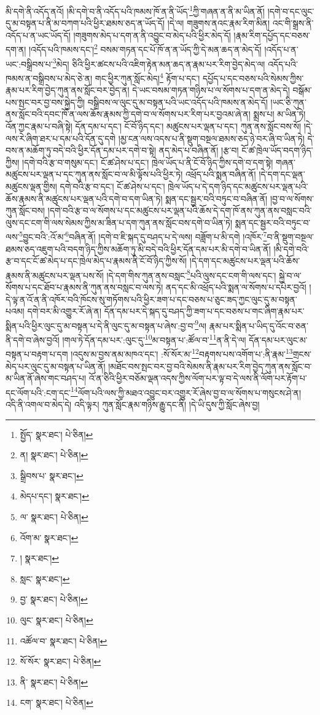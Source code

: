 མི་དགེ་ནི་འདོད་ནའོ། །མི་དགེ་བ་ནི་འདོད་པའི་ཁམས་ཁོ་ན་ནི་ཡོད་\footnote{སྤྱོད་  སྣར་ཐང་།  པེ་ཅིན། }ཀྱི་གཞན་ན་ནི་མ་ཡིན་ནོ། །དགེ་བ་དང་ལུང་དུ་མ་བསྟན་པ་ནི་མ་བཀག་པའི་ཕྱིར་ཐམས་ཅད་ན་ཡོད་དོ། །དེ་ལ། གཟུགས་ནའང་རྣམ་རིག་མིན། འང་གི་སྒྲས་ནི་འདོད་པ་ན་ཡང་ཡོད་དོ། །གཟུགས་མེད་པ་དག་ན་ནི་འབྱུང་བ་མེད་པའི་ཕྱིར་མེད་དོ། །རྣམ་རིག་དཔྱོད་དང་བཅས་དག་ན། །འདོད་པའི་ཁམས་དང་།\footnote{ན།  སྣར་ཐང་།  པེ་ཅིན། } བསམ་གཏན་དང་པོ་ཁོ་ན་ན་ཡོད་ཀྱི་དེ་མན་ཆད་ན་མེད་དོ། །འདོད་པ་ན་ཡང་:བསྒྲིབས་པ་\footnote{སྒྲིབས་པ་  སྣར་ཐང་། }མེད། ཅིའི་ཕྱིར་ཚངས་པའི་འཇིག་རྟེན་མན་ཆད་ན་རྣམ་པར་རིག་བྱེད་མེད་ལ། འདོད་པའི་ཁམས་ན་བསྒྲིབས་པ་མེད་ཅེ་ན། གང་ཕྱིར་ཀུན་སློང་མེད།\footnote{མེདཔ་དང་།  སྣར་ཐང་། } རྟོག་པ་དང་། དཔྱོད་པ་དང་བཅས་པའི་སེམས་ཀྱིས་རྣམ་པར་རིག་བྱེད་ཀུན་ནས་སློང་བར་བྱེད་ན། དེ་ཡང་བསམ་གཏན་གཉིས་པ་ལ་སོགས་པ་དག་ན་མེད་དེ། བསྒོམ་པས་སྤང་བར་བྱ་བས་སྐྱེད་ཀྱི། བསྒྲིབས་ལ་ལུང་དུ་མ་བསྟན་པའི་ཡང་འདོད་པའི་ཁམས་ན་མེད་དོ། །ཡང་ཅི་ཀུན་ནས་སློང་བའི་དབང་ཁོ་ན་ལས་ཆོས་རྣམས་ཀྱི་དགེ་བ་ལ་སོགས་པར་རིག་པར་བྱའམ་ཞེ་ན། སྨྲས་པ། མ་ཡིན་ཏེ། འོན་ཀྱང་རྣམ་པ་བཞི་སྟེ། དོན་དམ་པ་དང་། ངོ་བོ་ཉིད་དང་། མཚུངས་པར་ལྡན་པ་དང་། ཀུན་ནས་སློང་བས་སོ། །དེ་ལས་རེ་ཞིག་ཐར་པ་དམ་པའི་དོན་དུ་དགེ །མྱ་ངན་ལས་འདས་པ་ནི་སྡུག་བསྔལ་ཐམས་ཅད་ཉེ་བར་ཞི་བ་ཡིན་ཏེ། དེ་བས་ན་མཆོག་ཏུ་བདེ་བའི་ཕྱིར་དོན་དམ་པར་དགེ་བ་སྟེ། ནད་མེད་པ་བཞིན་ནོ། །རྩ་བ། ངོ་ཚ་ཁྲེལ་ཡོད་བདག་ཉིད་ཀྱིས། །དགེ་བའི་རྩ་བ་གསུམ་དང་། ངོ་ཚ་ཤེས་པ་དང་། ཁྲེལ་ཡོད་པ་ནི་ངོ་བོ་ཉིད་ཀྱིས་དགེ་བ་དག་སྟེ། གཞན་མཚུངས་པར་ལྡན་པ་དང་ཀུན་ནས་སློང་བ་ལ་མི་ལྟོས་པའི་ཕྱིར་ཏེ། འཕྲོད་པའི་སྨན་བཞིན་ནོ། །དེ་དག་དང་ལྡན་མཚུངས་ལྡན་གྱིས། དགེ་བའི་རྩ་བ་དང་། ངོ་ཚ་ཤེས་པ་དང་། ཁྲེལ་ཡོད་པ་དེ་དག་ཉིད་དང་མཚུངས་པར་ལྡན་པའི་ཆོས་རྣམས་ནི་མཚུངས་པར་ལྡན་པའི་དགེ་བ་དག་ཡིན་ཏེ། སྨན་དང་སྦྱར་བའི་བཏུང་བ་བཞིན་ནོ། །བྱ་བ་ལ་སོགས་ཀུན་སློང་བས། །དགེ་བའི་རྩ་བ་ལ་སོགས་པ་དང་མཚུངས་པར་ལྡན་པའི་ཆོས་དེ་དག་ཁོ་ནས་ཀུན་ནས་བསླང་བའི་ལུས་དང་ངག་གི་ལས་སེམས་ཀྱིས་མ་ཟིན་པ་དག་ཀུན་ནས་སློང་བས་དགེ་བ་ཡིན་ཏེ། སྨན་དང་སྦྱར་བའི་བཏུང་བ་ལས་\footnote{ལ་  སྣར་ཐང་།  པེ་ཅིན། }བྱུང་བའི་:འོ་མ་\footnote{འོག་མ་  སྣར་ཐང་། }བཞིན་ནོ། །དགེ་བ་ཇི་སྐད་དུ་བཤད་པ་དེ་ལས། བཟློག་པ་མི་དགེ །འཁོར་\footnote{།  སྣར་ཐང་། }བ་ནི་སྡུག་བསྔལ་ཐམས་ཅད་འཇུག་པའི་བདག་ཉིད་ཀྱིས་མཆོག་ཏུ་མི་བདེ་བའི་ཕྱིར་དོན་དམ་པར་མི་དགེ་བ་ཡིན་ནོ། །མི་དགེ་བའི་རྩ་བ་དང་ངོ་ཚ་མེད་པ་དང་ཁྲེལ་མེད་པ་རྣམས་ནི་ངོ་བོ་ཉིད་ཀྱིས་སོ། །དེ་དག་དང་མཚུངས་པར་ལྡན་པའི་ཆོས་རྣམས་ནི་མཚུངས་པར་ལྡན་པས་སོ། །དེ་དག་གིས་ཀུན་ནས་བསླང་\footnote{སླང་  སྣར་ཐང་། }པའི་ལུས་དང་ངག་གི་ལས་དང་། སྐྱེ་བ་ལ་སོགས་པ་དང་ཐོབ་པ་རྣམས་ནི་ཀུན་ནས་བསླང་བ་ལས་ཏེ། ནད་དང་མི་འཕྲོད་པའི་སྨན་ལ་སོགས་པ་དཔེར་བྱའོ། །དེ་ལྟ་ན་འོ་ན་ནི་འཁོར་བའི་ཁོངས་སུ་གཏོགས་པའི་ཕྱིར་ཟག་པ་དང་བཅས་པ་ཅུང་ཟད་ཀྱང་ལུང་དུ་མ་བསྟན་པའམ། དགེ་བར་མི་འགྱུར་རོ་ཞེ་ན། དོན་དམ་པར་དེ་སྐད་དུ་བཤད་ཀྱི་ཟག་པ་དང་བཅས་པ་གང་ཞིག་རྣམ་པར་སྨིན་པའི་ཕྱིར་ལུང་དུ་མ་བསྟན་པ་དེ་ནི་ལུང་དུ་མ་བསྟན་པ་ཞེས་:བྱ་བ་\footnote{བྱ་  སྣར་ཐང་།  པེ་ཅིན། }ལ། རྣམ་པར་སྨིན་པ་ཡིད་དུ་འོང་བ་ཅན་ནི་དགེ་བ་ཞེས་བྱའོ། །གལ་ཏེ་དོན་དམ་པར་:ལུང་དུ་\footnote{ལུང་  སྣར་ཐང་།  པེ་ཅིན། }མ་བསྟན་པ་:ཚོལ་བ་\footnote{འཚོལ་བ་  སྣར་ཐང་།  པེ་ཅིན། }ན་ནི་དེ་ལ། དོན་དམ་པར་ལུང་མ་བསྟན་པ་བརྟག་པ་དག །འདུས་མ་བྱས་ནམ་མཁའ་དང་། :སོ་སོར་མ་\footnote{སོ་སོར་  སྣར་ཐང་།  པེ་ཅིན། }བརྟགས་པས་འགོག་པ་:ནི་རྣམ་\footnote{ནི་  སྣར་ཐང་།  པེ་ཅིན། }གྲངས་མེད་པར་ལུང་དུ་མ་བསྟན་པ་ཡིན་ནོ། །མཐོང་བས་སྤང་བར་བྱ་བའི་སེམས་ནི་རྣམ་པར་རིག་བྱེད་ཀུན་ནས་སློང་བ་མ་ཡིན་ནོ་ཞེས་གང་བཤད་པ། འོ་ན་ཅིའི་ཕྱིར་བཅོམ་ལྡན་འདས་ཀྱིས་ལོག་པར་ལྟ་བ་དེ་ལས་ནི་ལོག་པར་རྟོག་པ་དང་ལོག་པའི་:ངག་དང་\footnote{ངག་  སྣར་ཐང་།  པེ་ཅིན། }ལོག་པའི་ལས་ཀྱི་མཐའ་འབྱུང་བར་འགྱུར་རོ་ཞེས་བྱ་བ་ལ་སོགས་པ་གསུངས་ཤེ་ན། འདི་ནི་འགལ་བ་མེད་དེ། འདི་ལྟར། ཀུན་སློང་རྣམ་གཉིས་རྒྱུ་དང་ནི། །དེ་ཡི་དུས་ཀྱི་སློང་ཞེས་བྱ། 